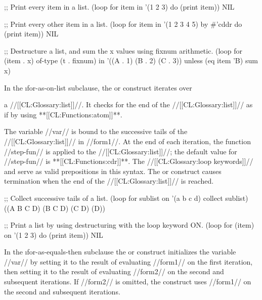 \code
;; Print every item in a list.
 (loop for item in '(1 2 3) do (print item))
\EV NIL
 
;; Print every other item in a list.
 (loop for item in '(1 2 3 4 5) by #'cddr
       do (print item))
\EV NIL
 
;; Destructure a list, and sum the x values using fixnum arithmetic.
 (loop for (item . x) of-type (t . fixnum) in '((A . 1) (B . 2) (C . 3))
       unless (eq item 'B) sum x)
\endcode

 
\endsubsubsubsubsection%

\endsubsubsubsection%


In the \i{for-as-on-list} subclause, the  or 
construct iterates over

a //[[CL:Glossary:list]]//. It checks for the
end of the //[[CL:Glossary:list]]// as if by using **[[CL:Functions:atom]]**.

The variable //var// is bound to the successive tails of the 
//[[CL:Glossary:list]]// in 
//form1//.  At the end of each iteration, the function //step-fun//
 is applied to the //[[CL:Glossary:list]]//; the default value for //step-fun// is **[[CL:Functions:cdr]]**.
 The //[[CL:Glossary:loop keywords]]//  and  serve as valid
prepositions in this syntax.
The  or  construct causes termination when the
end of the //[[CL:Glossary:list]]// is reached.
 

\code
;; Collect successive tails of a list.
 (loop for sublist on '(a b c d)
       collect sublist)
\EV ((A B C D) (B C D) (C D) (D))
 
;; Print a list by using destructuring with the loop keyword ON.
 (loop for (item) on '(1 2 3)
       do (print item))
\EV NIL
 
\endcode

\endsubsubsubsubsection%

\endsubsubsubsection%


In the \i{for-as-equals-then} subclause
the  
or  construct 
initializes the variable //var// by setting it to the
  result of evaluating //form1// on the first iteration, then setting
  it to the result of evaluating //form2// on the second and
  subsequent iterations.  If //form2// is omitted, the construct
  uses //form1// on the second and
  subsequent iterations.  


